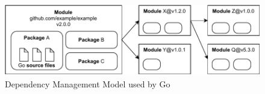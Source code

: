 \begin{figure}[htp!]
    \centering
    \includegraphics[width=\textwidth]{assets/figures/chapter2/dependency-model.pdf}
    \caption{Dependency Management Model used by Go}
    \label{fig:dependency-model}
\end{figure}
